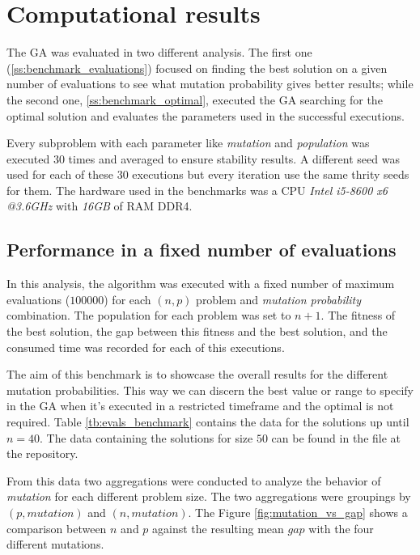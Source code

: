 \section{Computational results\label{s:computational_results}}

The GA was evaluated in two different analysis. The first one (\ref{ss:benchmark_evaluations})
focused on finding the best solution on a given number of evaluations to see what mutation probability
gives better results; while the second one, \ref{ss:benchmark_optimal}, executed the GA searching for
the optimal solution and evaluates the parameters used in the successful executions.

Every subproblem with each parameter like \emph{mutation} and \emph{population} was executed 30 times and
averaged to ensure stability results. A different seed was used for each of these 30 executions
but every iteration use the same thrity seeds for them. The hardware used in the benchmarks was a CPU
\emph{Intel i5-8600 x6 @3.6GHz} with \emph{16GB} of RAM DDR4.

\subsection{Performance in a fixed number of evaluations\label{ss:benchmark_evaluations}}

In this analysis, the algorithm was executed with a fixed number of maximum evaluations ($100000$)
for each $(n,p)$ problem and \emph{mutation probability} combination. The population for each
problem was set to $n+1$. The fitness of the best solution, the gap between this fitness and the best
solution, and the consumed time was recorded for each of this executions.

The aim of this benchmark is to showcase the overall results for the different mutation probabilities.
This way we can discern the best value or range to specify in the GA when it's executed in a restricted
timeframe and the optimal is not required.  Table \ref{tb:evals_benchmark}
contains the data for the solutions up until $n=40$. The data containing the solutions for size $50$
can be found in the  file at the repository\cite{SotoEstevezGA2024}.



From this data two aggregations were conducted to analyze the behavior of \emph{mutation} for each
different problem size. The two aggregations were groupings by $(p,mutation)$ and $(n,mutation)$.
The Figure \ref{fig:mutation_vs_gap}
shows a comparison between $n$ and $p$ against the resulting mean $gap$ with the four different mutations.

